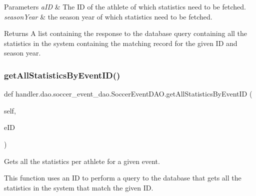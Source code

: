 \begin{DoxyParams}{Parameters}
{\em a\+ID} & The ID of the athlete of which statistics need to be fetched. \\
\hline
{\em season\+Year} & the season year of which statistics need to be fetched.\\
\hline
\end{DoxyParams}
\begin{DoxyReturn}{Returns}
A list containing the response to the database query containing all the statistics in the system containing the matching record for the given ID and season year. 
\end{DoxyReturn}
\mbox{\label{classhandler_1_1dao_1_1soccer__event__dao_1_1_soccer_event_d_a_o_a57749c2c503be1b9696024682fd3b0fe}} 
\subsubsection{\texorpdfstring{get\+All\+Statistics\+By\+Event\+I\+D()}{getAllStatisticsByEventID()}}
{\footnotesize\ttfamily def handler.\+dao.\+soccer\+\_\+event\+\_\+dao.\+Soccer\+Event\+D\+A\+O.\+get\+All\+Statistics\+By\+Event\+ID (\begin{DoxyParamCaption}\item[{}]{self,  }\item[{}]{e\+ID }\end{DoxyParamCaption})}



Gets all the statistics per athlete for a given event. 

This function uses an ID to perform a query to the database that gets all the statistics in the system that match the given ID.


